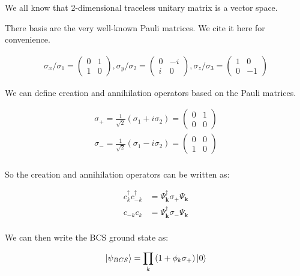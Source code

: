 \documentclass[14pt, a4paper]{extarticle}
\DeclarePairedDelimiter\ket{\lvert}{\rangle}
\begin{document}
We all know that 2-dimensional traceless unitary matrix is a vector space.

There basis are the very well-known Pauli matrices. We cite it here for convenience.

\begin{align}
    \sigma_x / \sigma_1= \begin{pmatrix} 0 & 1 \\ 1 & 0 \end{pmatrix},
    \sigma_y / \sigma_2 = \begin{pmatrix} 0 & -i \\ i & 0 \end{pmatrix},
    \sigma_z / \sigma_3 = \begin{pmatrix} 1 & 0 \\ 0 & -1 \end{pmatrix}
\end{align}

We can define creation and annihilation operators based on the Pauli matrices.

\begin{align}
    \sigma_+ = \frac{1}{\sqrt{2}} \left( \sigma_1 + i \sigma_2 \right) = \begin{pmatrix} 0 & 1 \\ 0 & 0 \end{pmatrix} \\
    \sigma_- = \frac{1}{\sqrt{2}} \left( \sigma_1 - i \sigma_2 \right) = \begin{pmatrix} 0 & 0 \\ 1 & 0 \end{pmatrix} \\
\end{align}

So the creation and annihilation operators can be written as:

\begin{align}
    c_{k}^\dagger c_{-k}^\dagger & = \Psi_{\mathbf{k}}^{\dagger} \sigma_+ \Psi_{\mathbf{k}} \\
    c_{ -k} c_{k} & = \Psi_{\mathbf{k}}^{\dagger} \sigma_- \Psi_{\mathbf{k}} \\
\end{align}

We can then write the BCS ground state as:

\begin{align}
    \ket{\psi_{BCS}} = \prod_{k} \left(1 + \phi_{k} \sigma_+\right) \ket{0} \\
\end{align}
\end{document}
